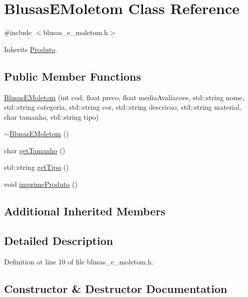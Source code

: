 \hypertarget{class_blusas_e_moletom}{}\section{Blusas\+E\+Moletom Class Reference}
\label{class_blusas_e_moletom}


{\ttfamily \#include $<$blusas\+\_\+e\+\_\+moletom.\+h$>$}



Inherits \hyperlink{class_produto}{Produto}.

\subsection*{Public Member Functions}
\begin{DoxyCompactItemize}
\item 
\hyperlink{class_blusas_e_moletom_aedc119affff5e7685176d0e4bdf8170e}{Blusas\+E\+Moletom} (int cod, float preco, float media\+Avaliacoes, std\+::string nome, std\+::string categoria, std\+::string cor, std\+::string descricao, std\+::string material, char tamanho, std\+::string tipo)
\item 
\hyperlink{class_blusas_e_moletom_afcf9fd23819dba9be2e0646fa38905ff}{$\sim$\+Blusas\+E\+Moletom} ()
\item 
char \hyperlink{class_blusas_e_moletom_a6856973d4591330c7706f34661b0cfc4}{get\+Tamanho} ()
\item 
std\+::string \hyperlink{class_blusas_e_moletom_a15a35daa601730aa8b724761ca261931}{get\+Tipo} ()
\item 
void \hyperlink{class_blusas_e_moletom_aff1f34b5847d9304f0b4169f59df0277}{imprime\+Produto} ()
\end{DoxyCompactItemize}
\subsection*{Additional Inherited Members}


\subsection{Detailed Description}


Definition at line 10 of file blusas\+\_\+e\+\_\+moletom.\+h.



\subsection{Constructor \& Destructor Documentation}
\mbox{\label{class_blusas_e_moletom_aedc119affff5e7685176d0e4bdf8170e}} 
